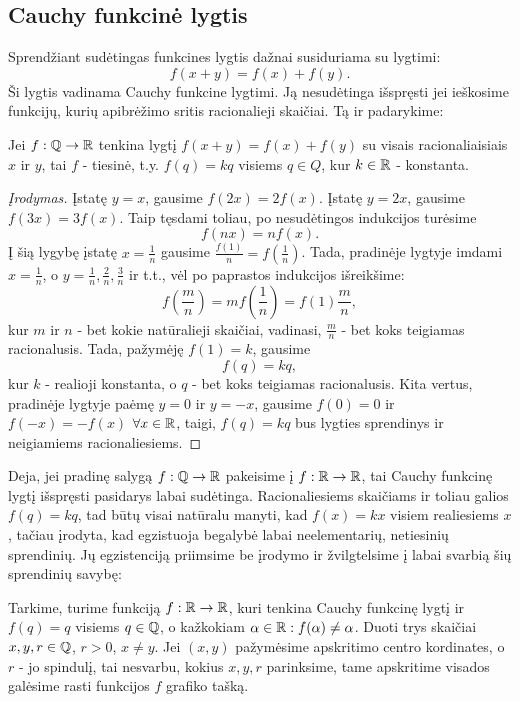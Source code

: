 \newpage
\subsection{Cauchy funkcinė lygtis}

Sprendžiant sudėtingas funkcines lygtis dažnai susiduriama su lygtimi:
$$f(x+y)=f(x)+f(y).$$
Ši lygtis vadinama Cauchy funkcine lygtimi. Ją nesudėtinga išspręsti jei
ieškosime funkcijų, kurių apibrėžimo sritis racionalieji skaičiai. Tą ir
padarykime:

\begin{thm}
  Jei $f:\mathbb Q \to \mathbb R$ tenkina lygtį $f(x+y)=f(x)+f(y)$ su visais
  racionaliaisiais $x$ ir $y$, tai $f$ - tiesinė, t.y. $f(q)=kq$ visiems $q
  \in Q$, kur $k\in \mathbb R$ - konstanta.
\end{thm}

\begin{proof}[Įrodymas]
  Įstatę $y=x$, gausime $f(2x)=2f(x)$. Įstatę $y=2x$, gausime $f(3x)=3f(x)$.
  Taip tęsdami toliau, po nesudėtingos indukcijos turėsime
  $$f(nx)=nf(x).$$
  Į šią lygybę įstatę $x=\frac{1}{n}$ gausime
  $\frac{f(1)}{n}=f(\frac{1}{n})$. Tada, pradinėje lygtyje imdami
  $x=\frac{1}{n}$, o $y=\frac{1}{n},\frac{2}{n},\frac{3}{n}$ ir t.t., vėl po
  paprastos indukcijos išreikšime:
  $$f(\frac{m}{n})=mf(\frac{1}{n})=f(1)\frac{m}{n},$$ kur $m$ ir $n$ -
  bet kokie natūralieji skaičiai, vadinasi, $\frac{m}{n}$ - bet koks teigiamas
  racionalusis. Tada, pažymėję $f(1)=k$, gausime $$f(q)=kq,$$ kur $k$ -
  realioji konstanta, o $q$ - bet koks teigiamas racionalusis. Kita vertus,
  pradinėje lygtyje paėmę $y=0$ ir $y=-x$, gausime $f(0)=0$ ir $f(-x)=-f(x)$
  $\forall x\in\mathbb R$, taigi, $f(q)=kq$ bus lygties sprendinys ir neigiamiems
  racionaliesiems.
\end{proof}

Deja, jei pradinę salygą $f:\mathbb Q\rightarrow\mathbb R$ pakeisime į
$f:\mathbb R\rightarrow\mathbb R$, tai Cauchy funkcinę lygtį išspręsti pasidarys labai
sudėtinga. Racionaliesiems skaičiams ir toliau galios $f(q)=kq$, tad būtų
visai natūralu manyti, kad  $f(x)=kx$ visiem realiesiems $x$, tačiau
įrodyta, kad egzistuoja begalybė labai neelementarių, netiesinių
sprendinių. Jų egzistenciją priimsime be įrodymo ir žvilgtelsime į labai
svarbią šių sprendinių savybę:

\begin{thm}
  Tarkime, turime funkciją $f:\mathbb R\to\mathbb R$, kuri tenkina Cauchy funkcinę lygtį ir
  $f(q)=q$ visiems $q\in\mathbb Q$, o kažkokiam $\alpha\in\mathbb R: f(\alpha) \neq
  \alpha$. Duoti trys skaičiai $x, y, r \in \mathbb Q$, $r>0$, $x\neq y$.  Jei $(x,
  y)$ pažymėsime apskritimo centro kordinates, o $r$ - jo spindulį, tai
  nesvarbu, kokius $x, y, r$ parinksime, tame apskritime visados galėsime
  rasti funkcijos $f$ grafiko tašką.
\end{thm}

